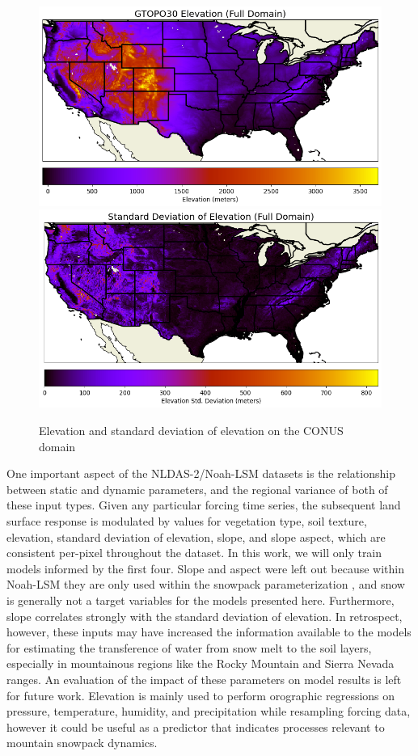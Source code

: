\begin{figure}[hp!]
    \centering
    \includegraphics[width=.85\linewidth,draft=false]{figures/static_elev.png}
    \includegraphics[width=.85\linewidth,draft=false]{figures/static_elev-stdev.png}
    \caption{Elevation and standard deviation of elevation on the CONUS domain}
    \label{static-elevation}
\end{figure}

One important aspect of the NLDAS-2/Noah-LSM datasets is the relationship between static and dynamic parameters, and the regional variance of both of these input types. Given any particular forcing time series, the subsequent land surface response is modulated by values for vegetation type, soil texture, elevation, standard deviation of elevation, slope, and slope aspect, which are consistent per-pixel throughout the dataset. In this work, we will only train models informed by the first four. Slope and aspect were left out because within Noah-LSM they are only used within the snowpack parameterization \citep{barlage_noah_2010}, and snow is generally not a target variables for the models presented here. Furthermore, slope correlates strongly with the standard deviation of elevation. In retrospect, however, these inputs may have increased the information available to the models for estimating the transference of water from snow melt to the soil layers, especially in mountainous regions like the Rocky Mountain and Sierra Nevada ranges. An evaluation of the impact of these parameters on model results is left for future work. Elevation is mainly used to perform orographic regressions on pressure, temperature, humidity, and precipitation while resampling forcing data, however it could be useful as a predictor that indicates processes relevant to mountain snowpack dynamics.


